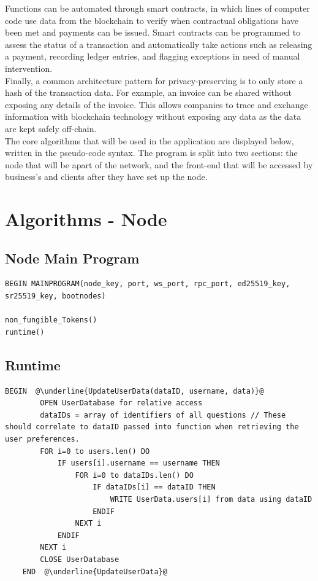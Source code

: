 Functions can be automated through smart contracts, in which lines of computer code use data from the blockchain to verify when contractual obligations have been met and payments can be issued. Smart contracts can be programmed to assess the status of a transaction and automatically take actions such as releasing a payment, recording ledger entries, and flagging exceptions in need of manual intervention. \\

Finally, a common architecture pattern for privacy-preserving is to only store a hash of the transaction data. For example, an invoice can be shared without exposing any details of the invoice. This allows companies to trace and exchange information with blockchain technology without exposing any data as the data are kept safely off-chain. \\


The core algorithms that will be used in the application are displayed below, written in the pseudo-code syntax. The program is split into two sections: the node that will be apart of the network, and the front-end that will be accessed by business's and clients after they have set up the node. \\

\section{Algorithms - Node}
\subsection{Node Main Program}

\begin{lstlisting}[caption=Main Program, escapechar=\@]
	BEGIN MAINPROGRAM(node_key, port, ws_port, rpc_port, ed25519_key, sr25519_key, bootnodes)

non_fungible_Tokens()
runtime()

\end{lstlisting}

\subsection{Runtime}

\begin{lstlisting}[caption=Update User Data, escapechar=\@]
	BEGIN  @\underline{UpdateUserData(dataID, username, data)}@
		OPEN UserDatabase for relative access
		dataIDs = array of identifiers of all questions // These should correlate to dataID passed into function when retrieving the user preferences.
		FOR i=0 to users.len() DO
			IF users[i].username == username THEN
				FOR i=0 to dataIDs.len() DO
					IF dataIDs[i] == dataID THEN
						WRITE UserData.users[i] from data using dataID	
					ENDIF
				NEXT i
			ENDIF
		NEXT i
		CLOSE UserDatabase
	END  @\underline{UpdateUserData}@
\end{lstlisting}
